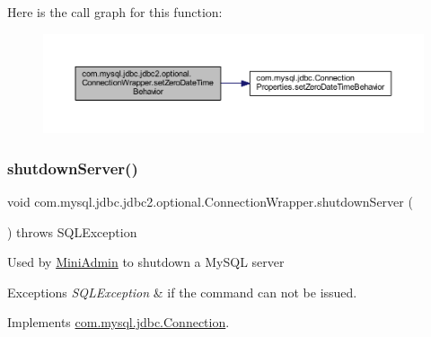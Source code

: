 Here is the call graph for this function\+:
\nopagebreak
\begin{figure}[H]
\begin{center}
\leavevmode
\includegraphics[width=350pt]{classcom_1_1mysql_1_1jdbc_1_1jdbc2_1_1optional_1_1_connection_wrapper_a5514653da00c94961479c2ad44b0cc5f_cgraph}
\end{center}
\end{figure}
\mbox{\label{classcom_1_1mysql_1_1jdbc_1_1jdbc2_1_1optional_1_1_connection_wrapper_a23e3bc174ec3f98397698fcddc3d3ca0}} 
\subsubsection{\texorpdfstring{shutdown\+Server()}{shutdownServer()}}
{\footnotesize\ttfamily void com.\+mysql.\+jdbc.\+jdbc2.\+optional.\+Connection\+Wrapper.\+shutdown\+Server (\begin{DoxyParamCaption}{ }\end{DoxyParamCaption}) throws S\+Q\+L\+Exception}

Used by \mbox{\hyperlink{classcom_1_1mysql_1_1jdbc_1_1_mini_admin}{Mini\+Admin}} to shutdown a My\+S\+QL server


\begin{DoxyExceptions}{Exceptions}
{\em S\+Q\+L\+Exception} & if the command can not be issued. \\
\hline
\end{DoxyExceptions}


Implements \mbox{\hyperlink{interfacecom_1_1mysql_1_1jdbc_1_1_connection_a58ca482a0546e93af285d0e9836d7fae}{com.\+mysql.\+jdbc.\+Connection}}.

